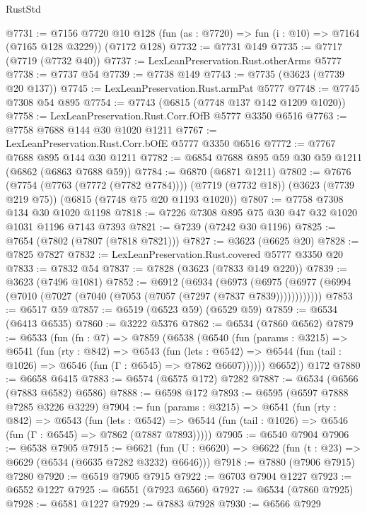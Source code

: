 \begin{lexlean}{RustStd}
\begin{coremodule}
@7731 := @7156
    @7720
    @10
    @128
    (fun (as : @7720) => fun (i : @10) => @7164 (@7165 @128 @3229))
    (@7172 @128)
@7732 := @7731 @149
@7735 := @7717 (@7719 (@7732 @40))
@7737 := LexLeanPreservation.Rust.otherArms @5777
@7738 := @7737 @54
@7739 := @7738 @149
@7743 := @7735 (@3623 (@7739 @20 @137))
@7745 := LexLeanPreservation.Rust.armPat @5777
@7748 := @7745 @7308 @54 @895
@7754 := @7743 (@6815 (@7748 @137 @142 @1209 @1020))
@7758 := LexLeanPreservation.Rust.Corr.fOfB @5777 @3350 @6516
@7763 := @7758 @7688 @144 @30 @1020 @1211
@7767 := LexLeanPreservation.Rust.Corr.bOfE @5777 @3350 @6516
@7772 := @7767 @7688 @895 @144 @30 @1211
@7782 := @6854 @7688 @895 @59 @30 @59 @1211 (@6862 (@6863 @7688 @59))
@7784 := @6870 (@6871 @1211)
@7802 := @7676
    (@7754 (@7763 (@7772 (@7782 @7784))))
    (@7719 (@7732 @18))
    (@3623 (@7739 @219 @75))
    (@6815 (@7748 @75 @20 @1193 @1020))
@7807 := @7758 @7308 @134 @30 @1020 @1198
@7818 := @7226 @7308 @895 @75 @30 @47 @32 @1020 @1031 @1196 @7143 @7393
@7821 := @7239 (@7242 @30 @1196)
@7825 := @7654 (@7802 (@7807 (@7818 @7821)))
@7827 := @3623 (@6625 @20)
@7828 := @7825 @7827
@7832 := LexLeanPreservation.Rust.covered @5777 @3350 @20
@7833 := @7832 @54
@7837 := @7828 (@3623 (@7833 @149 @220))
@7839 := @3623 (@7496 @1081)
@7852 := @6912
    (@6934
      (@6973 (@6975 (@6977 (@6994 (@7010 (@7027 (@7040 (@7053 (@7057 (@7297 (@7837 @7839))))))))))))
@7853 := @6517 @59
@7857 := @6519 (@6523 @59) (@6529 @59)
@7859 := @6534 (@6413 @6535)
@7860 := @3222 @5376
@7862 := @6534 (@7860 @6562)
@7879 := @6533
    (fun (fn : @7) =>
    @7859
      (@6538
        (@6540
          (fun (params : @3215) =>
          @6541
            (fun (rty : @842) =>
            @6543
              (fun (lets : @6542) =>
              @6544 (fun (tail : @1026) => @6546 (fun (Γ : @6545) => @7862 @6607))))))
        @6652))
    @172
@7880 := @6658 @6415
@7883 := @6574 (@6575 @172) @7282
@7887 := @6534 (@6566 (@7883 @6582) @6586)
@7888 := @6598 @172
@7893 := @6595 (@6597 @7888 @7285 @3226 @3229)
@7904 := fun (params : @3215) =>
  @6541
    (fun (rty : @842) =>
    @6543
      (fun (lets : @6542) =>
      @6544 (fun (tail : @1026) => @6546 (fun (Γ : @6545) => @7862 (@7887 @7893)))))
@7905 := @6540 @7904
@7906 := @6538 @7905
@7915 := @6621 (fun (U : @6620) => @6622 (fun (t : @23) => @6629 (@6534 (@6635 @7282 @3232) @6646)))
@7918 := @7880 (@7906 @7915) @7280
@7920 := @6519 @7905 @7915
@7922 := @6703 @7904 @1227
@7923 := @6552 @1227
@7925 := @6551 (@7923 @6560)
@7927 := @6534 (@7860 @7925)
@7928 := @6581 @1227
@7929 := @7883 @7928
@7930 := @6566 @7929

\end{coremodule}
\end{lexlean}
